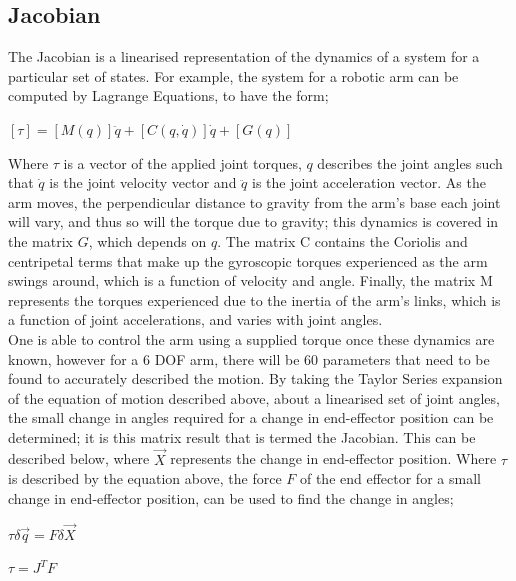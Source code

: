 \documentclass[12pt,openany,a4paper]{book}
\begin{document}
\subsection{Jacobian}
The Jacobian is a linearised representation of the dynamics of a system for a particular set of states. For example, the system for a robotic arm can be computed by Lagrange Equations, to have the form;

\vspace{\baselineskip}
\begin{center}
$[\tau] = [M(q)] \ddot{q} + [ C (q, \dot{q} ) ] \dot{q} + [G(q)]$
\end{center}

\vspace{\baselineskip}
Where $\tau$ is a vector of the applied joint torques, $q$ describes the joint angles such that $\dot{q}$ is the joint velocity vector and $\ddot{q}$ is the joint acceleration vector. As the arm moves, the perpendicular distance to gravity from the arm's base each joint will vary, and thus so will the torque due to gravity; this dynamics is covered in the matrix $G$, which depends on $q$. The matrix C contains the Coriolis and centripetal terms that make up the gyroscopic torques experienced as the arm swings around, which is a function of velocity and angle. Finally, the matrix M represents the torques experienced due to the inertia of the arm's links, which is a function of joint accelerations, and varies with joint angles.\\
One is able to control the arm using a supplied torque once these dynamics are known, however for a 6 DOF arm, there will be 60 parameters that need to be found to accurately described the motion. By taking the Taylor Series expansion of the equation of motion described above, about a linearised set of joint angles, the small change in angles required for a change in end-effector position can be determined; it is this matrix result that is termed the Jacobian. This can be described below, where $\vec{X}$ represents the change in end-effector position. Where $\tau$ is described by the equation above, the force $F$ of the end effector for a small change in end-effector position, can be used to find the change in angles;

\vspace{\baselineskip}
\begin{center}
$\tau \delta \vec{q} = F \delta	\vec{X}$
\end{center}

\vspace{\baselineskip}
\begin{center}
$\tau = J^T F$
\end{center}
\end{document}
